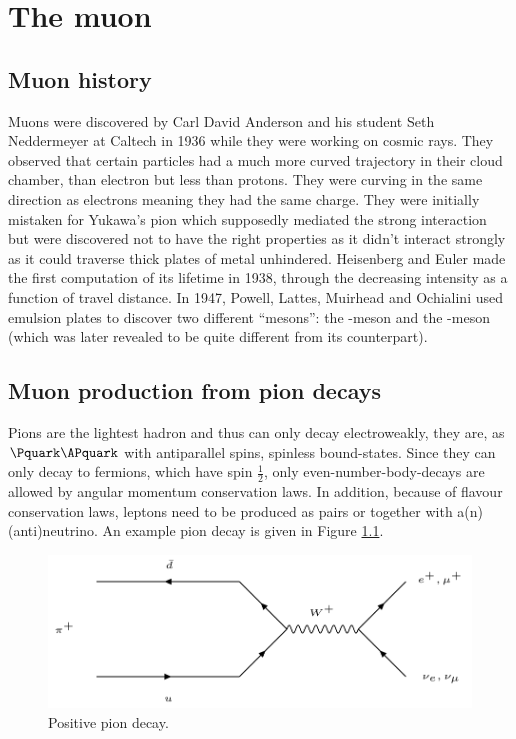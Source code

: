 

\chapter{The muon}

\section{Muon history}

Muons were discovered by Carl David Anderson and his student Seth Neddermeyer at Caltech in 1936 while they were working on cosmic rays. They observed that certain particles had a much more curved trajectory in their cloud chamber, than electron but less than protons. They were curving in the same direction as electrons meaning they had the same charge. They were initially mistaken for Yukawa's pion which supposedly mediated the strong interaction but were discovered not to have the right properties as it didn't interact strongly as it could traverse thick plates of metal unhindered. Heisenberg and Euler made the first computation of its lifetime in 1938, through the decreasing intensity as a function of travel distance. In 1947, Powell, Lattes, Muirhead and Ochialini used emulsion plates to discover two different ``mesons'': the \Ppi-meson and the \Pmu-meson (which was later revealed to be quite different from its counterpart).

\section{Muon production from pion decays}

Pions are the lightest hadron and thus can only decay electroweakly, they are, as $\Pquark\APquark$ with antiparallel spins, spinless bound-states. Since they can only decay to fermions, which have spin $\frac{1}{2}$, only even-number-body-decays are allowed by angular momentum conservation laws. In addition, because of flavour conservation laws, leptons need to be produced as pairs or together with a(n) (anti)neutrino. An example pion decay is given in Figure \ref{fig:piedec}.


\begin{figure}[htbp]
\centering
\includegraphics[width=0.7\linewidth]{./fig/pideac.png}
\caption{Positive pion decay.}
\label{fig:piedec}
\end{figure}

